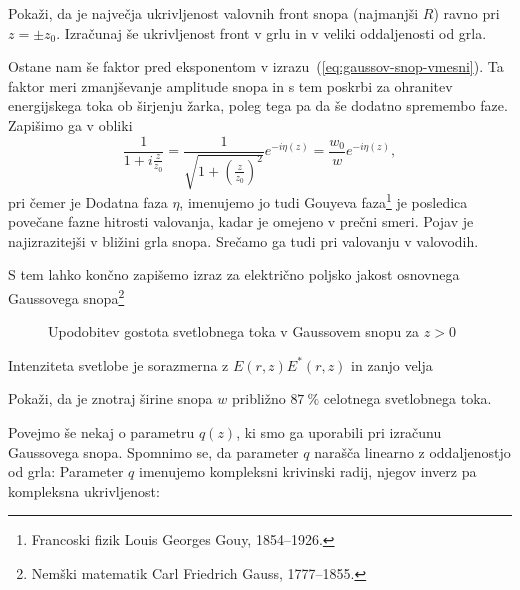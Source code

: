 \begin{definition}
\label{naloga-ukrivljenost-snopa}
Pokaži, da je največja ukrivljenost valovnih front snopa (najmanjši $R$) ravno pri $z=\pm z_{0}$.
Izračunaj še ukrivljenost front v grlu in v veliki oddaljenosti od grla.
\end{definition}
 
Ostane nam še faktor pred eksponentom v izrazu~(\ref{eq:gaussov-snop-vmesni}). Ta faktor meri
zmanjševanje amplitude snopa in s tem poskrbi za ohranitev energijskega
toka ob širjenju žarka, poleg tega pa da še dodatno spremembo faze. Zapišimo ga v obliki
\begin{equation}
\frac{1}{1+i\frac{z}{z_{0}}}=\frac{1}{\sqrt{1+(\frac{z}{z_0})^{2}}}e^{-i\eta(z)}=\frac{w_{0}}{w}e^{-i\eta(z)},
\end{equation}
 pri čemer je
Dodatna faza $\eta$, imenujemo jo tudi Gouyeva 
faza\footnote{Francoski fizik Louis Georges Gouy, 1854--1926.}
je posledica povečane fazne hitrosti valovanja,
kadar je omejeno v prečni smeri. Pojav je najizrazitejši v bližini
grla snopa. Srečamo ga tudi pri valovanju v valovodih.

S tem lahko končno zapišemo izraz za električno poljsko jakost osnovnega Gaussovega 
snopa\footnote{Nemški matematik Carl Friedrich Gauss, 1777--1855.}

\begin{figure}[h]
\centering
\def\svgwidth{110truemm} 

\caption{Upodobitev gostota svetlobnega toka v Gaussovem snopu za $z>0$ }
\label{fig:Gauss_3D}
\end{figure}

Intenziteta svetlobe je sorazmerna z $E(r,z)E^*(r,z)$ in zanjo velja

\begin{definition}
\label{naloga-širina-snopa}
Pokaži, da je znotraj širine snopa $w$ približno $87~\%$ celotnega svetlobnega toka.
\end{definition}

Povejmo še nekaj o parametru $q(z)$, ki smo ga uporabili pri izračunu Gaussovega snopa. Spom\-nimo 
se, da parameter $q$ narašča linearno z oddaljenostjo od grla:
Parameter $q$ imenujemo kompleksni krivinski radij, 
njegov inverz pa kompleksna ukrivljenost: 

